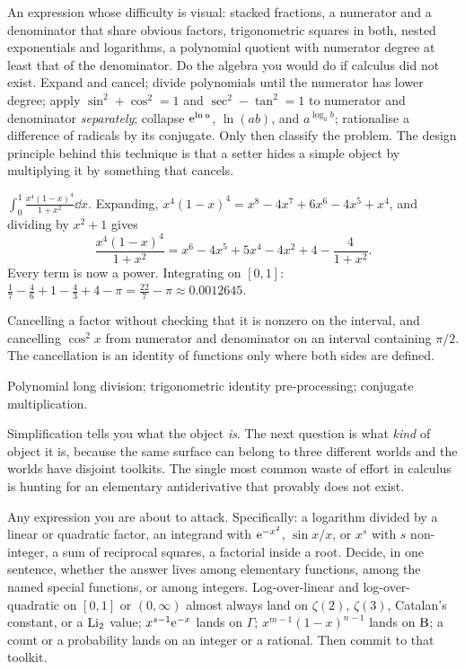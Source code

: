 \cue An expression whose difficulty is visual: stacked fractions, a numerator and a denominator that share obvious factors, trigonometric squares in both, nested exponentials and logarithms, a polynomial quotient with numerator degree at least that of the denominator.
\method Do the algebra you would do if calculus did not exist. Expand and cancel; divide polynomials until the numerator has lower degree; apply $\sin^{2}+\cos^{2}=1$ and $\sec^{2}-\tan^{2}=1$ to numerator and denominator \emph{separately}; collapse $\mathrm{e}^{\ln u}$, $\ln(ab)$, and $a^{\log_{a}b}$; rationalise a difference of radicals by its conjugate. Only then classify the problem. The design principle behind this technique is that a setter hides a simple object by multiplying it by something that cancels.

\begin{worked}
$\displaystyle\int_{0}^{1}\frac{x^{4}(1-x)^{4}}{1+x^{2}}\dd x$. Expanding, $x^{4}(1-x)^{4}=x^{8}-4x^{7}+6x^{6}-4x^{5}+x^{4}$, and dividing by $x^{2}+1$ gives
\[
\frac{x^{4}(1-x)^{4}}{1+x^{2}}=x^{6}-4x^{5}+5x^{4}-4x^{2}+4-\frac{4}{1+x^{2}} .
\]
Every term is now a power. Integrating on $[0,1]$: $\tfrac17-\tfrac46+1-\tfrac43+4-\pi=\tfrac{22}{7}-\pi\approx 0.0012645$.
\end{worked}

\begin{trap}
Cancelling a factor without checking that it is nonzero on the interval, and cancelling $\cos^{2}x$ from numerator and denominator on an interval containing $\pi/2$. The cancellation is an identity of functions only where both sides are defined.
\end{trap}

\begin{seealsob}Polynomial long division; trigonometric identity pre-processing; conjugate multiplication.\end{seealsob}

Simplification tells you what the object \emph{is}. The next question is what \emph{kind} of object it is, because the same surface can belong to three different worlds and the worlds have disjoint toolkits. The single most common waste of effort in calculus is hunting for an elementary antiderivative that provably does not exist.

\cue Any expression you are about to attack. Specifically: a logarithm divided by a linear or quadratic factor, an integrand with $\mathrm{e}^{-x^{2}}$, $\sin x/x$, or $x^{s}$ with $s$ non-integer, a sum of reciprocal squares, a factorial inside a root.
\method Decide, in one sentence, whether the answer lives among elementary functions, among the named special functions, or among integers. Log-over-linear and log-over-quadratic on $[0,1]$ or $(0,\infty)$ almost always land on $\zeta(2)$, $\zeta(3)$, Catalan's constant, or a $\operatorname{Li}_{2}$ value; $x^{s-1}\mathrm{e}^{-x}$ lands on $\Gamma$; $x^{m-1}(1-x)^{n-1}$ lands on $\mathrm{B}$; a count or a probability lands on an integer or a rational. Then commit to that toolkit.

